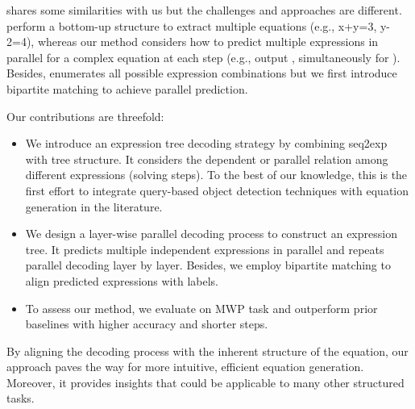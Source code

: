 \documentclass[11pt]{article}
\begin{document}
\citet{cao2021bottom} shares some similarities with us but the challenges and approaches are different. \citet{cao2021bottom} perform a bottom-up structure to extract multiple equations (e.g., x+y=3, y-2=4), whereas our method considers how to predict multiple expressions in parallel for a complex equation at each step (e.g., output ,  simultaneously for ). Besides, \citet{cao2021bottom} enumerates all possible expression combinations but we first introduce bipartite matching to achieve parallel prediction. 






Our contributions are threefold:

\begin{itemize}

  \setlength{\parskip}{2pt}
  \setlength{\itemsep}{0pt plus 1pt}









\item We introduce an expression tree decoding strategy by combining seq2exp with tree structure. It considers the dependent or parallel relation among different expressions (solving steps). To the best of our knowledge, this is the first effort to integrate query-based object detection techniques with equation generation in the literature.











\item We design a layer-wise parallel decoding process to construct an expression tree. It predicts multiple independent expressions in parallel and repeats parallel decoding layer by layer. Besides, we employ bipartite matching to align predicted expressions with labels. 







\item To assess our method, we evaluate on MWP task and outperform prior baselines with higher accuracy and shorter steps.


\end{itemize}

By aligning the decoding process with the inherent structure of the equation, our approach paves the way for more intuitive, efficient equation generation. Moreover, it provides insights that could be applicable to many other structured tasks.
\end{document}
